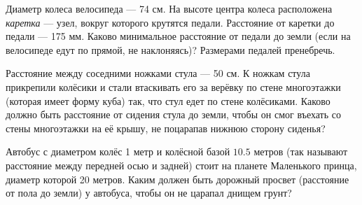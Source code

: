 ﻿
\begin{enumerate}

\itA Диаметр колеса велосипеда — 74 см. На высоте центра колеса расположена {\it каретка} — узел, вокруг которого крутятся педали. Расстояние от каретки до педали — 175 мм. Каково минимальное расстояние от педали до земли (если на велосипеде едут по прямой, не наклоняясь)? Размерами педалей пренебречь.

\itB Расстояние между соседними ножками стула — 50 см. К ножкам стула прикрепили колёсики и стали втаскивать его за верёвку по стене многоэтажки (которая имеет форму куба) так, что стул едет по стене колёсиками. Каково должно быть расстояние от сидения стула до земли, чтобы он смог въехать со стены многоэтажки на её крышу, не поцарапав нижнюю сторону сиденья?

\itC Автобус с диаметром колёс 1 метр и колёсной базой $10.5$ метров (так называют расстояние между передней осью и задней) стоит на планете Маленького принца, диаметр которой 20 метров. Каким должен быть дорожный просвет (расстояние от пола до земли) у автобуса, чтобы он не царапал днищем грунт?
\end{enumerate}